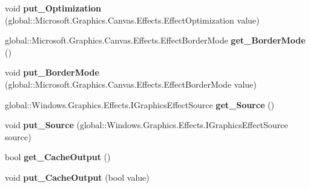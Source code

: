 \begin{DoxyCompactItemize}
void {\bfseries put\+\_\+\+Optimization} (global\+::\+Microsoft.\+Graphics.\+Canvas.\+Effects.\+Effect\+Optimization value)
\item 
\mbox{\label{class_microsoft_1_1_graphics_1_1_canvas_1_1_effects_1_1_directional_blur_effect_a8e1e8704473064ff603694cb02c0c78f}} 
global\+::\+Microsoft.\+Graphics.\+Canvas.\+Effects.\+Effect\+Border\+Mode {\bfseries get\+\_\+\+Border\+Mode} ()
\item 
\mbox{\label{class_microsoft_1_1_graphics_1_1_canvas_1_1_effects_1_1_directional_blur_effect_acdd57b5d08067ae3121bdbefa68e50b8}} 
void {\bfseries put\+\_\+\+Border\+Mode} (global\+::\+Microsoft.\+Graphics.\+Canvas.\+Effects.\+Effect\+Border\+Mode value)
\item 
\mbox{\label{class_microsoft_1_1_graphics_1_1_canvas_1_1_effects_1_1_directional_blur_effect_aef24cab3895c1c8498616466fcb52a51}} 
global\+::\+Windows.\+Graphics.\+Effects.\+I\+Graphics\+Effect\+Source {\bfseries get\+\_\+\+Source} ()
\item 
\mbox{\label{class_microsoft_1_1_graphics_1_1_canvas_1_1_effects_1_1_directional_blur_effect_aa034111bc667082df708438e58b6ae46}} 
void {\bfseries put\+\_\+\+Source} (global\+::\+Windows.\+Graphics.\+Effects.\+I\+Graphics\+Effect\+Source source)
\item 
\mbox{\label{class_microsoft_1_1_graphics_1_1_canvas_1_1_effects_1_1_directional_blur_effect_a5138db2da9de6fc0292de9196ca4ad04}} 
bool {\bfseries get\+\_\+\+Cache\+Output} ()
\item 
\mbox{\label{class_microsoft_1_1_graphics_1_1_canvas_1_1_effects_1_1_directional_blur_effect_ad0ff3191c7cf5af3adb8552dceb94c61}} 
void {\bfseries put\+\_\+\+Cache\+Output} (bool value)
\item 
\mbox{\label{class_microsoft_1_1_graphics_1_1_canvas_1_1_effects_1_1_directional_blur_effect_a4405c8306c5c98a67fcc220ae5ad8ae6}} 

\end{DoxyCompactItemize}
